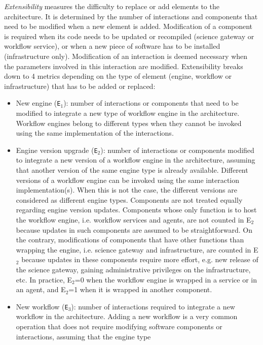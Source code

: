 \documentclass[preprint,3p,twocolumn]{elsarticle}
\begin{document}
\emph{Extensibility} measures the difficulty to replace or add
elements to the architecture. It is determined by the number of interactions and
components that need to be modified when a new element is
added. Modification of a component is required when its code needs to
be updated or recompiled (science gateway or workflow service), or
when a new piece of software has to be installed (infrastructure
only). Modification of an interaction is deemed necessary when the
parameters involved in this interaction are modified.  Extensibility
breaks down to 4 metrics depending on the type of element (engine, workflow or infrastructure) that has to
be added or replaced:
\begin{itemize}[leftmargin=0cm,itemindent=0.35cm,itemsep=0cm]
\item New engine (\texttt{E$_1$}): number of interactions or
  components that need to be modified to integrate a new type of
  workflow engine in the architecture. Workflow engines belong to
  different types when they cannot be invoked using the same
  implementation of the interactions.
 \item Engine version upgrade (\texttt{E$_2$}): number of interactions
  or components modified to integrate a new version of a workflow
  engine in the architecture, assuming that another version of the
  same engine type is already available. Different versions of a
  workflow engine can be invoked using the same interaction
  implementation(s). When this is not the case, the different versions
  are considered as different engine types. Components are not treated
  equally regarding engine version updates. Components whose only
  function is to host the workflow engine, i.e. workflow services and
  agents, are not counted in E$_2$ because updates in such components
  are assumed to be straightforward. On the contrary, modifications of
  components that have other functions than wrapping the engine,
  i.e. science gateway and infrastructure, are counted in E$_2$
  because updates in these components require more effort, e.g. new
  release of the science gateway, gaining administrative privileges on
  the infrastructure, etc. In practice, E$_2$=0 when the workflow
  engine is wrapped in a service or in an agent, and E$_2$=1 when it is
  wrapped in another component.  
\item New workflow (\texttt{E$_3$}): number of interactions required
  to integrate a new workflow in the architecture. Adding a new
  workflow is a very common operation that does not require modifying
  software components or interactions, assuming that the engine type

\end{itemize}
\end{document}
